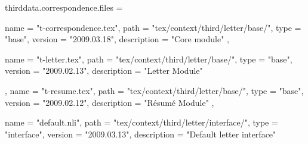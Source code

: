 thirddata.correspondence.files = {
    {
        name        = "t-correspondence.tex",
        path        = "tex/context/third/letter/base/",
        type        = "base",
        version     = "2009.03.18",
        description = "Core module"
    } ,
    {
        name        = "t-letter.tex",
        path        = "tex/context/third/letter/base/",
        type        = "base",
        version     = "2009.02.13",
        description = "Letter Module"

    } ,
    {
        name        = "t-resume.tex",
        path        = "tex/context/third/letter/base/",
        type        = "base",
        version     = "2009.02.12",
        description = "Résumé Module"
    } ,
    {
        name        = "default.nli",
        path        = "tex/context/third/letter/interface/",
        type        = "interface",
        version     = "2009.03.13",
        description = "Default letter interface"

}}
